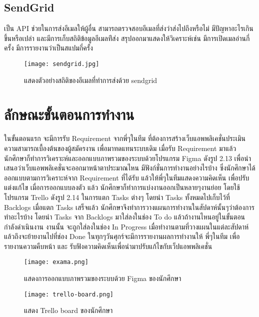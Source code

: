 \subsection{SendGrid}

เป็น API ช่วยในการส่งอีเมลให้ผู้อื่น สามารถตรวจสอบอีเมลที่ส่งว่าส่งไปถึงหรือไม่ มีปัญหาอะไรเกินขึ้นหรือเปล่า และมีการเก็บสถิติข้อมูลอีเมลท่ีส่ง สรุปออกมาแสดงให้วิเคราะห์เช่น มีการเปิดเมลอ่านกี่ครั้ง มีการรายงานว่าเป็นสแปมกี่ครั้ง

\begin{figure}[H]
  \centering
  \texttt{[image: sendgrid.jpg]}
  \caption{แสดงตัวอย่างสถิติของอีเมลที่ทำการส่งด้วย sendgrid}
  \label{Fig:robo3t}
\end{figure}

\section{ลักษณะขั้นตอนการทํางาน}

ในขั้นตอนแรก จะมีการรับ Requirement จากพี่ๆในทีม ที่ต้องการสร้างเว็บแอพพลิเคชั่นประเมินความสามารถเบื้องต้นของผู้สมัครงาน เพื่อมาทดแทนระบบเดิม
เมื่อรับ Requirement มาแล้ว นักศึกษาก็ทำการวิเคราะห์และออกแบบภาพรวมของระบบด้วยโปรแกรม Figma ดังรูป 2.13 เพื่อนำเสนอว่าเว็บแอพพลิเคชั่นจะออกมาหน้าตาประมาณไหน 
มีฟังก์ชั่นการทำงานอย่างไรบ้าง ซึ่งนักศึกษาได้ออกแบบตามการวิเคราะห์จาก Requirement ที่ได้รับ แล้วให้พี่ๆในทีมแสดงความคิดเห็น เพื่อปรับแต่งแก้ไข เมื่อการออกแบบลงตัว
แล้ว นักศึกษาก็ทำการแบ่งงานออกเป็นหลายๆงานย่อย โดยใช้โปรแกรม Trello ดังรูป 2.14 ในการแตก Tasks ต่างๆ โดยนำ Tasks ทั้งหมดไปเก็บไว้ที่ Backlogs เมื่อแตก Tasks เสร็จแล้ว
นักศึกษาจึงทำการวางแผนการทำงานในสัปดาห์นั้นๆว่าต้องการทำอะไรบ้าง โดยนำ Tasks จาก Backlogs มาใส่ลงในช่อง To do แล้วถ้างานไหนอยู่ในขั้นตอนกำลังดำเนินงาน งานนั้น
จะถูกใส่ลงในช่อง In Progress เมื่อทำงานตามที่วางแผนในแต่ละสัปดาห์แล้วถึงจะย้ายงานไปที่ช่อง Done ในทุกๆวันศุกร์จะมีการรายงานผลการทำงานให้ พี่ๆในทีม เพื่อรายงานความคืบหน้า
และ รับฟังความคิดเห็นเพื่อนำมาปรับแก้ไขกับเว็ปแอพพลิเคชั่น

\begin{figure}[H]
  \centering
  \texttt{[image: exama.png]}
  \caption{แสดงการออกแบบภาพรวมของระบบด้วย Figma ของนักศึกษา}
  \label{Fig:myTrelloBoard}
\end{figure}

\begin{figure}[H]
  \centering
  \texttt{[image: trello-board.png]}
  \caption{แสดง Trello board ของนักศึกษา}
  \label{Fig:myTrelloBoard}
\end{figure}

